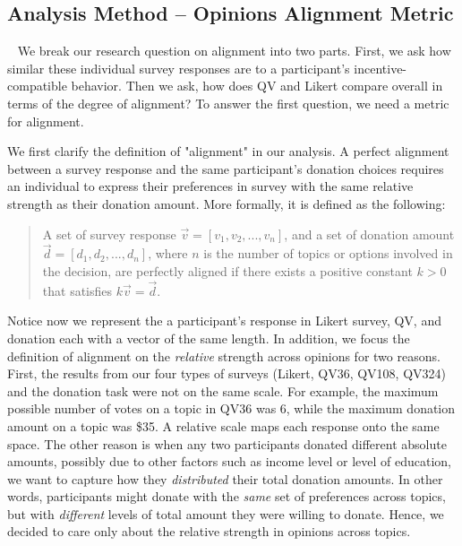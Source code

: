 \subsection{Analysis Method -- Opinions Alignment Metric}~\label{alignment_metric}
We break our research question on alignment into two parts. First, we ask how similar these individual survey responses are to a participant's incentive-compatible behavior. Then we ask, how does QV and Likert compare overall in terms of the degree of alignment? To answer the first question, we need a metric for alignment.

We first clarify the definition of "alignment" in our analysis. A perfect alignment between a survey response and the same participant's donation choices requires an individual to express their preferences in survey with the same relative strength as their donation amount. More formally, it is defined as the following:

\begin{quote}
    A set of survey response $\vec{v} = [v_1, v_2, ..., v_n]$, and a set of donation amount $\vec{d} = [d_1, d_2, ..., d_n]$, where $n$ is the number of topics or options involved in the decision, are perfectly aligned if there exists a positive constant $k>0$ that satisfies $k\vec{v} = \vec{d}$.
\end{quote}

Notice now we represent the a participant's response in Likert survey, QV, and donation each with a vector of the same length. In addition, we focus the definition of alignment on the \textit{relative} strength across opinions for two reasons. First, the results from our four types of surveys (Likert, QV36, QV108, QV324) 
and the donation task were not on the same scale. 
For example, the maximum possible number of votes on a topic in QV36 was 6, while the maximum donation amount on a topic was \$35. A relative scale maps each response onto the same space. The other reason is when any two participants donated different absolute amounts, possibly due to other factors such as income level or level of education, we want to capture how they \textit{distributed} their total donation amounts. In other words, participants might donate with the \textit{same} set of preferences across topics, but with \textit{different} levels of total amount they were willing to donate. Hence, we decided to care only about 
the relative strength in opinions across topics.

